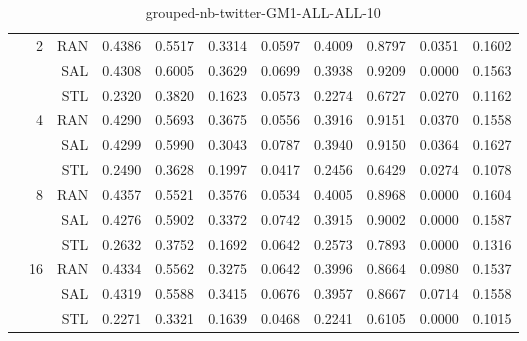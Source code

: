 \begin{center}
\begin{table}[htbp]
\begin{tabular}{ | r | r | r | r | r | r | r | r | r | r | r |}
 & \multirow{3}{*}{2} & RAN & 0.4386 & 0.5517 & 0.3314 & 0.0597 & 0.4009 & 0.8797 & 0.0351 & 0.1602\\ \cline{3-11}
 &   & SAL & 0.4308 & 0.6005 & 0.3629 & 0.0699 & 0.3938 & 0.9209 & 0.0000 & 0.1563\\ \cline{3-11}
 &   & STL & 0.2320 & 0.3820 & 0.1623 & 0.0573 & 0.2274 & 0.6727 & 0.0270 & 0.1162\\ \cline{2-11}
 & \multirow{3}{*}{4} & RAN & 0.4290 & 0.5693 & 0.3675 & 0.0556 & 0.3916 & 0.9151 & 0.0370 & 0.1558\\ \cline{3-11}
 &   & SAL & 0.4299 & 0.5990 & 0.3043 & 0.0787 & 0.3940 & 0.9150 & 0.0364 & 0.1627\\ \cline{3-11}
 &   & STL & 0.2490 & 0.3628 & 0.1997 & 0.0417 & 0.2456 & 0.6429 & 0.0274 & 0.1078\\ \cline{2-11}
 & \multirow{3}{*}{8} & RAN & 0.4357 & 0.5521 & 0.3576 & 0.0534 & 0.4005 & 0.8968 & 0.0000 & 0.1604\\ \cline{3-11}
 &   & SAL & 0.4276 & 0.5902 & 0.3372 & 0.0742 & 0.3915 & 0.9002 & 0.0000 & 0.1587\\ \cline{3-11}
 &   & STL & 0.2632 & 0.3752 & 0.1692 & 0.0642 & 0.2573 & 0.7893 & 0.0000 & 0.1316\\ \cline{2-11}
 & \multirow{3}{*}{16} & RAN & 0.4334 & 0.5562 & 0.3275 & 0.0642 & 0.3996 & 0.8664 & 0.0980 & 0.1537\\ \cline{3-11}
 &   & SAL & 0.4319 & 0.5588 & 0.3415 & 0.0676 & 0.3957 & 0.8667 & 0.0714 & 0.1558\\ \cline{3-11}
 &   & STL & 0.2271 & 0.3321 & 0.1639 & 0.0468 & 0.2241 & 0.6105 & 0.0000 & 0.1015\\ \cline{2-11}
\hline
\end{tabular}
\caption{grouped-nb-twitter-GM1-ALL-ALL-10}
\end{table}
\end{center}

